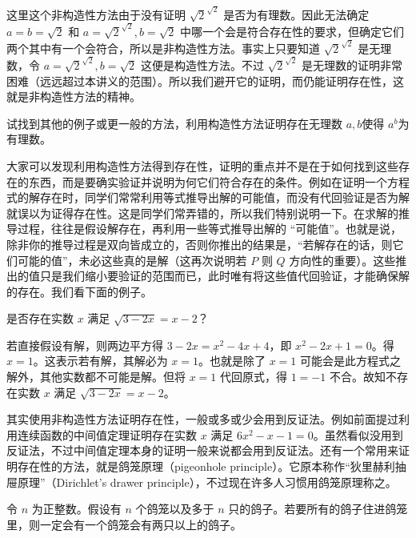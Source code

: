 这里这个非构造性方法由于没有证明 $\sqrt{2}^{\sqrt{2}}$ 是否为有理数。因此无法确定 $a = b = \sqrt{2}$ 和 $a = \sqrt{2}^{\sqrt{2}}, b = \sqrt{2}$ 中哪一个会是符合存在性的要求，但确定它们两个其中有一个会符合，所以是非构造性方法。事实上只要知道 $\sqrt{2}^{\sqrt{2}}$ 是无理数，令 $a = \sqrt{2}^{\sqrt{2}}, b = \sqrt{2}$ 这便是构造性方法。不过 $\sqrt{2}^{\sqrt{2}}$ 是无理数的证明非常困难（远远超过本讲义的范围）。所以我们避开它的证明，而仍能证明存在性，这就是非构造性方法的精神。

\begin{question}
试找到其他的例子或更一般的方法，利用构造性方法证明存在无理数 $a, b$使得 $a^{b}$为有理数。
\end{question}

大家可以发现利用构造性方法得到存在性，证明的重点并不是在于如何找到这些存在的东西，而是要确实验证并说明为何它们符合存在的条件。例如在证明一个方程式的解存在时，同学们常常利用等式推导出解的可能值，而没有代回验证是否为解就误以为证得存在性。这是同学们常弄错的，所以我们特别说明一下。在求解的推导过程，往往是假设解存在，再利用一些等式推导出解的 “可能值”。也就是说，除非你的推导过程是双向皆成立的，否则你推出的结果是，“若解存在的话，则它们可能的值”，未必这些真的是解（这再次说明若 $P$ 则 $Q$ 方向性的重要）。这些推出的值只是我们缩小要验证的范围而已，此时唯有将这些值代回验证，才能确保解的存在。我们看下面的例子。

\begin{example}
是否存在实数 $x$ 满足 $\sqrt{3 - 2x} = x - 2$？
\end{example}

若直接假设有解，则两边平方得 $3 - 2x = x^{2} - 4x + 4$，即 $x^{2} - 2x + 1 = 0$。得 $x = 1$。这表示若有解，其解必为 $x = 1$。也就是除了 $x = 1$ 可能会是此方程式之解外，其他实数都不可能是解。但将 $x = 1$ 代回原式，得 $1 = - 1$ 不合。故知不存在实数 $x$ 满足 $\sqrt{3 - 2x} = x - 2$。

其实使用非构造性方法证明存在性，一般或多或少会用到反证法。例如前面提过利用连续函数的中间值定理证明存在实数 $x$ 满足 $6x^{2} - x - 1 = 0$。虽然看似没用到反证法，不过中间值定理本身的证明一般来说都会用到反证法。还有一个常用来证明存在性的方法，就是鸽笼原理（pigeonhole principle）。它原本称作“狄里赫利抽屉原理”（Dirichlet's drawer principle），不过现在许多人习惯用鸽笼原理称之。

\begin{theorem}[鸽笼原理]
令 $n$ 为正整数。假设有 $n$ 个鸽笼以及多于 $n$ 只的鸽子。若要所有的鸽子住进鸽笼里，则一定会有一个鸽笼会有两只以上的鸽子。
\end{theorem}

